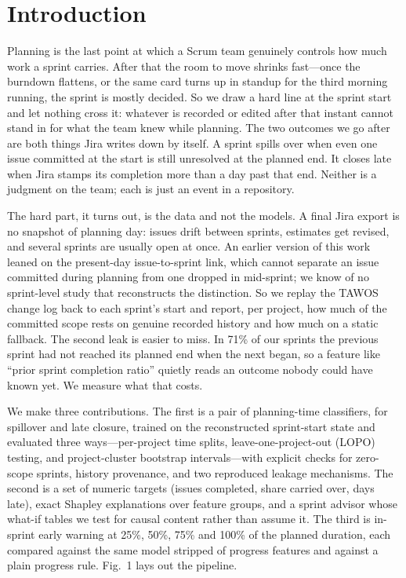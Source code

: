 \documentclass[conference]{IEEEtran}
\begin{document}
\section{Introduction}

Planning is the last point at which a Scrum team genuinely controls how much work a sprint carries. After that the room to move shrinks fast---once the burndown flattens, or the same card turns up in standup for the third morning running, the sprint is mostly decided. So we draw a hard line at the sprint start and let nothing cross it: whatever is recorded or edited after that instant cannot stand in for what the team knew while planning. The two outcomes we go after are both things Jira writes down by itself. A sprint spills over when even one issue committed at the start is still unresolved at the planned end. It closes late when Jira stamps its completion more than a day past that end. Neither is a judgment on the team; each is just an event in a repository.

The hard part, it turns out, is the data and not the models. A final Jira export is no snapshot of planning day: issues drift between sprints, estimates get revised, and several sprints are usually open at once. An earlier version of this work leaned on the present-day issue-to-sprint link, which cannot separate an issue committed during planning from one dropped in mid-sprint; we know of no sprint-level study that reconstructs the distinction. So we replay the TAWOS change log back to each sprint's start and report, per project, how much of the committed scope rests on genuine recorded history and how much on a static fallback. The second leak is easier to miss. In 71\% of our sprints the previous sprint had not reached its planned end when the next began, so a feature like ``prior sprint completion ratio'' quietly reads an outcome nobody could have known yet. We measure what that costs.

We make three contributions. The first is a pair of planning-time classifiers, for spillover and late closure, trained on the reconstructed sprint-start state and evaluated three ways---per-project time splits, leave-one-project-out (LOPO) testing, and project-cluster bootstrap intervals---with explicit checks for zero-scope sprints, history provenance, and two reproduced leakage mechanisms. The second is a set of numeric targets (issues completed, share carried over, days late), exact Shapley explanations over feature groups, and a sprint advisor whose what-if tables we test for causal content rather than assume it. The third is in-sprint early warning at 25\%, 50\%, 75\% and 100\% of the planned duration, each compared against the same model stripped of progress features and against a plain progress rule. Fig.~1 lays out the pipeline.
\end{document}
